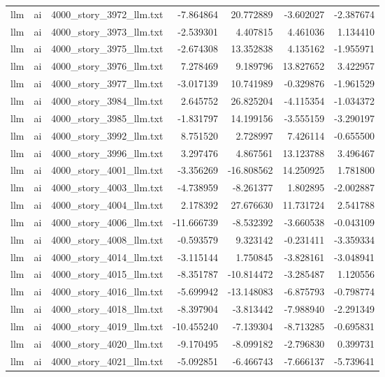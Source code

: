 \begin{longtable}{lllrrrr}
llm & ai & 4000\_story\_3972\_llm.txt & -7.864864 & 20.772889 & -3.602027 & -2.387674 \\
llm & ai & 4000\_story\_3973\_llm.txt & -2.539301 & 4.407815 & 4.461036 & 1.134410 \\
llm & ai & 4000\_story\_3975\_llm.txt & -2.674308 & 13.352838 & 4.135162 & -1.955971 \\
llm & ai & 4000\_story\_3976\_llm.txt & 7.278469 & 9.189796 & 13.827652 & 3.422957 \\
llm & ai & 4000\_story\_3977\_llm.txt & -3.017139 & 10.741989 & -0.329876 & -1.961529 \\
llm & ai & 4000\_story\_3984\_llm.txt & 2.645752 & 26.825204 & -4.115354 & -1.034372 \\
llm & ai & 4000\_story\_3985\_llm.txt & -1.831797 & 14.199156 & -3.555159 & -3.290197 \\
llm & ai & 4000\_story\_3992\_llm.txt & 8.751520 & 2.728997 & 7.426114 & -0.655500 \\
llm & ai & 4000\_story\_3996\_llm.txt & 3.297476 & 4.867561 & 13.123788 & 3.496467 \\
llm & ai & 4000\_story\_4001\_llm.txt & -3.356269 & -16.808562 & 14.250925 & 1.781800 \\
llm & ai & 4000\_story\_4003\_llm.txt & -4.738959 & -8.261377 & 1.802895 & -2.002887 \\
llm & ai & 4000\_story\_4004\_llm.txt & 2.178392 & 27.676630 & 11.731724 & 2.541788 \\
llm & ai & 4000\_story\_4006\_llm.txt & -11.666739 & -8.532392 & -3.660538 & -0.043109 \\
llm & ai & 4000\_story\_4008\_llm.txt & -0.593579 & 9.323142 & -0.231411 & -3.359334 \\
llm & ai & 4000\_story\_4014\_llm.txt & -3.115144 & 1.750845 & -3.828161 & -3.048941 \\
llm & ai & 4000\_story\_4015\_llm.txt & -8.351787 & -10.814472 & -3.285487 & 1.120556 \\
llm & ai & 4000\_story\_4016\_llm.txt & -5.699942 & -13.148083 & -6.875793 & -0.798774 \\
llm & ai & 4000\_story\_4018\_llm.txt & -8.397904 & -3.813442 & -7.988940 & -2.291349 \\
llm & ai & 4000\_story\_4019\_llm.txt & -10.455240 & -7.139304 & -8.713285 & -0.695831 \\
llm & ai & 4000\_story\_4020\_llm.txt & -9.170495 & -8.099182 & -2.796830 & 0.399731 \\
llm & ai & 4000\_story\_4021\_llm.txt & -5.092851 & -6.466743 & -7.666137 & -5.739641 \\

\end{longtable}
